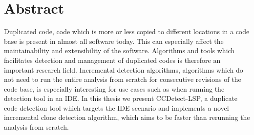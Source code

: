 \chapter*{Abstract}

Duplicated code, code which is more or less copied to different locations in a code base
is present in almost all software today. This can especially affect the maintainability
and extensibility of the software. Algorithms and tools which facilitates detection and
management of duplicated codes is therefore an important research field. Incremental
detection algorithms, algorithms which do not need to run the entire analysis from scratch
for consecutive revisions of the code base, is especially interesting for use cases such
as when running the detection tool in an IDE. In this thesis we present CCDetect-LSP, a
duplicate code detection tool which targets the IDE scenario and implements a novel
incremental clone detection algorithm, which aims to be faster than rerunning the analysis
from scratch.
